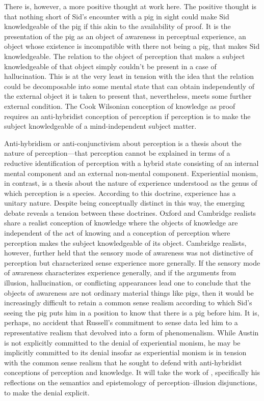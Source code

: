 \documentclass[11pt]{article}
\begin{document}
There is, however, a more positive thought at work here. The positive thought is that nothing short of Sid's encounter with a pig in sight could make Sid knowledgeable of the pig if this akin to the availability of proof. It is the presentation of the pig as an object of awareness in perceptual experience, an object whose existence is incompatible with there not being a pig, that makes Sid knowledgeable. The relation to the object of perception that makes a subject knowledgeable of that object simply couldn't be present in a case of hallucination. This is at the very least in tension with the idea that the relation could be decomposable into some mental state that can obtain independently of the external object it is taken to present that, nevertheless, meets some further external condition. The Cook Wilsonian conception of knowledge as proof requires an anti-hybridist conception of perception if perception is to make the subject knowledgeable of a mind-independent subject matter. 

Anti-hybridism or anti-conjunctivism about perception is a thesis about the nature of perception---that perception cannot be explained in terms of a reductive identification of perception with a hybrid state consisting of an internal mental component and an external non-mental component. Experiential monism, in contrast, is a thesis about the nature of experience understood as the genus of which perception is a species. According to this doctrine, experience has a unitary nature. Despite being conceptually distinct in this way, the emerging debate reveals a tension between these doctrines. Oxford and Cambridge realists share a realist conception of knowledge where the objects of knowledge are independent of the act of knowing and a conception of perception where perception makes the subject knowledgeable of its object. Cambridge realists, however, further held that the sensory mode of awareness was not distinctive of perception but characterized sense experience more generally. If the sensory mode of awareness characterizes experience generally, and if the arguments from illusion, hallucination, or conflicting appearances lead one to conclude that the objects of awareness are not ordinary material things like pigs, then it would be increasingly difficult to retain a common sense realism according to which Sid's seeing the pig puts him in a position to know that there is a pig before him. It is, perhaps, no accident that Russell's commitment to sense data led him to a representative realism that devolved into a form of phenomenalism. While Austin is not explicitly committed to the denial of experiential monism, he may be implicitly committed to its denial insofar as experiential monism is in tension with the common sense realism that he sought to defend with anti-hybridist conceptions of perception and knowledge. It will take the work of \citet{Hinton:1973js}, specifically his reflections on the semantics and epistemology of perception--illusion disjunctions, to make the denial explicit.
\end{document}
